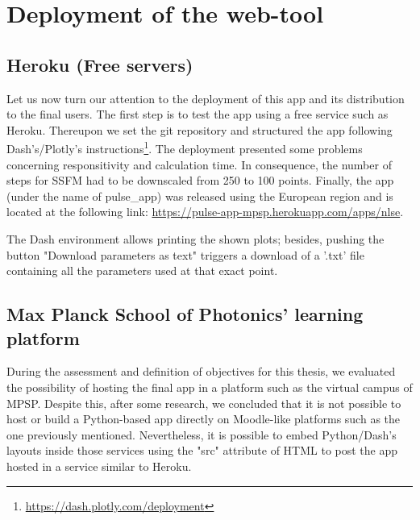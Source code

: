 



    \section{Deployment of the web-tool}
        \subsection{Heroku (Free servers)}
            Let us now turn our attention to the deployment of this app and its distribution to the final users. The first step is to test the app using a free service such as Heroku. Thereupon we set the git repository and structured the app following Dash's/Plotly's instructions\footnote{\url{https://dash.plotly.com/deployment}}. The deployment presented some problems concerning responsitivity and calculation time. In consequence, the number of steps for SSFM had to be downscaled from 250 to 100 points. Finally, the app (under the name of pulse\_app) was released using the European region and is located at the following link: \url{https://pulse-app-mpsp.herokuapp.com/apps/nlse}.
            
            The Dash environment allows printing the shown plots; besides, pushing the button "Download parameters as text" triggers a download of a '.txt' file containing all the parameters used at that exact point.
    
       
        
        
        
        \subsection{Max Planck School of Photonics' learning platform}
        During the assessment and definition of objectives for this thesis, we evaluated the possibility of hosting the final app in a platform such as the virtual campus of \gls{MPSP}. Despite this, after some research, we concluded that it is not possible to host or build a Python-based app directly on Moodle-like platforms such as the one previously mentioned. Nevertheless, it is possible to embed Python/Dash's layouts inside those services using the "src" attribute of HTML to post the app hosted in a service similar to Heroku.
         




    